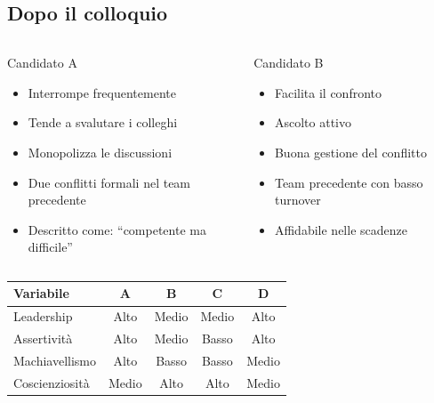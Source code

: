 \documentclass[compress]{beamer}
\begin{document}
\subsection*{Dopo il colloquio}
\begin{frame}
	
\begin{columns}[T]
		
		
		\begin{block}{Candidato A}
			\begin{itemize}
				\item Interrompe frequentemente
				\item Tende a svalutare i colleghi
				\item Monopolizza le discussioni
				\item Due conflitti formali nel team precedente
				\item Descritto come: ``competente ma difficile''
			\end{itemize}
		\end{block}
		
	
		
		
		\begin{block}{Candidato B}
			\begin{itemize}
				\item Facilita il confronto
				\item Ascolto attivo
				\item Buona gestione del conflitto
				\item Team precedente con basso turnover
				\item Affidabile nelle scadenze
			\end{itemize}
		\end{block}
	\end{columns}
	
	\small
	\vspace{3mm}
	\centering
	\begin{tabular}{lcccc}
		\hline
		\textbf{Variabile} & \textbf{A} & \textbf{B} & \textbf{C} & \textbf{D} \\
		\hline
		Leadership & Alto & Medio & Medio & Alto \\
		Assertività & Alto & Medio & Basso & Alto \\
		Machiavellismo & Alto & Basso & Basso & Medio \\
		Coscienziosità & Medio & Alto & Alto & Medio \\
		\hline
	\end{tabular}
	
	
\end{frame}
\end{document}

